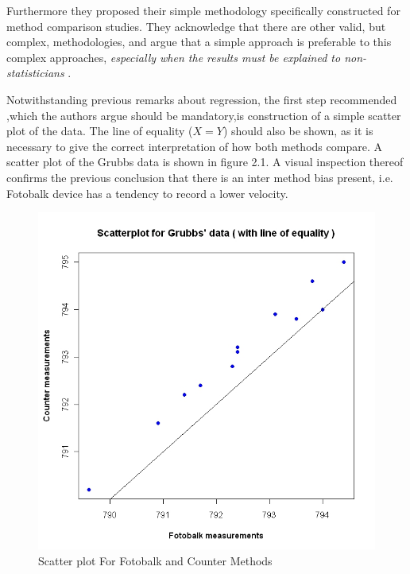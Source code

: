\documentclass[12pt, a4paper]{report}
\theoremstyle{plain}
\theoremstyle{definition}
\theoremstyle{remark}
\begin{document}
	
	Furthermore they proposed their simple methodology specifically
	constructed for method comparison studies. They acknowledge that
	there are other valid, but complex, methodologies, and argue that
	a simple approach is preferable to this complex approaches,
	\emph{especially when the results must be explained to
		non-statisticians} \citep*{BA83}.
	
	\smallskip
	
	Notwithstanding previous remarks about regression, the first step
	recommended ,which the authors argue should be mandatory,is
	construction of a simple scatter plot of the data. The line of
	equality ($X=Y$) should also be shown, as it is necessary to give
	the correct interpretation of how both methods compare. A scatter
	plot of the Grubbs data is shown in figure 2.1. A visual
	inspection thereof confirms the previous conclusion that there is
	an inter method bias present, i.e. Fotobalk device has a tendency
	to record a lower velocity.
	
	\begin{figure}[h!]
		\begin{center}
			\includegraphics[width=130mm]{images/GrubbsScatter.jpeg}
			\caption{Scatter plot For Fotobalk and Counter Methods}\label{GrubbsScatter}
		\end{center}
	\end{figure}
	
\end{document}
